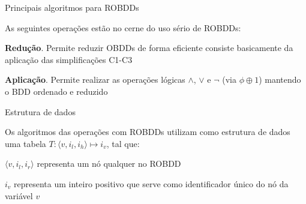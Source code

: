 \expandafter\documentclass\expandafter[table, usenames, svgnames, dvipsnames,14pt, \classopts]{beamer}
\begin{document}
\begin{frame}{Principais algoritmos para ROBDDs}

    As seguintes operações estão no cerne do uso sério de ROBDDs:
    
    \begin{outline}
        \1 \textbf{Redução}. Permite reduzir OBDDs de forma eficiente
            \2[-] consiste basicamente da aplicação das simplificações C1-C3
            
        \1 \textbf{Aplicação}. Permite realizar as operações lógicas $\land$, $\lor$ e $\lnot$ (via $\phi \oplus 1$)
            \2[-] mantendo o BDD ordenado e reduzido
    \end{outline}

\end{frame}

\begin{frame}{Estrutura de dados}

    Os algoritmos das operações com ROBDDs utilizam como estrutura de dados uma tabela $T: \langle v,i_l,i_h \rangle \mapsto i_v$, tal que:

    \small
    \begin{outline}
        \1 $\langle v,i_l,i_r \rangle$ representa um nó qualquer no ROBDD
            
        \vspace{1em}
            
        \1 $i_v$ representa um inteiro positivo que serve como identificador único do nó da variável $v$
    \end{outline}

\end{frame}
\end{document}
